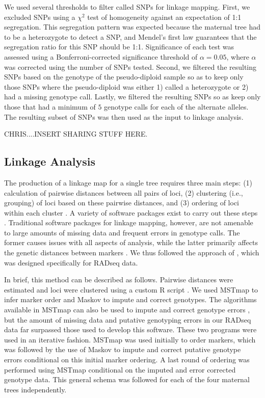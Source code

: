 \documentclass[11pt]{article}
\begin{document}
We used several thresholds to filter called SNPs for linkage mapping. First, 
we excluded SNPs using a $\chi^2$ test of homogeneity against an expectation of 1:1 segregation. This segregation 
pattern was expected because the maternal tree had to be a heterozygote to detect a SNP, and Mendel's first law 
guarantees that the segregation ratio for this SNP should be 1:1. Significance of each test was 
assessed using a Bonferroni-corrected significance threshold of $\alpha = 0.05$, where $\alpha$ was corrected using the 
number of SNPs tested. Second, we filtered the resulting SNPs based on the genotype of the pseudo-diploid sample so as 
to keep only those SNPs where the pseudo-diploid was either 1) called a heterozygote or 2) had a missing genotype call.
Lastly, we filtered the resulting SNPs so as keep only those that had a minimum of $5$ genotype calls for each of the 
alternate alleles. The resulting subset of SNPs was then used as the input to linkage analysis.

CHRIS....INSERT SHARING STUFF HERE.

\subsection*{Linkage Analysis}\label{ss:linkage}
The production of a linkage map for a single tree requires three main steps: (1) calculation of 
pairwise distances between all pairs of loci, (2) clustering (i.e., grouping) of loci based on these pairwise distances, 
and (3) ordering of loci within each cluster \citep{Cheema:2009}.  A variety of software packages exist to carry out these steps 
\citep[e.g.,][]{VanOoijen:2011}. Traditional software packages for linkage mapping, however, are not amenable to large 
amounts of missing data and frequent errors in genotype calls. The former causes issues with all aspects of analysis, while 
the latter primarily affects the genetic distances between markers \citep{Hackett:2003, Cartwright:2007}. We thus followed the approach 
of \citet{Ward:2013}, which was designed specifically for RADseq data. 

In brief, this method can be described as follows. Pairwise distances were estimated and loci were clustered using a 
custom R script \citep{R:2013}. We used MSTmap \citep{Wu:2008a} 
to infer marker order and Maskov \citep{Ward:2013} to impute and correct genotypes. The algorithms available
in MSTmap can also be used to impute and correct genotype errors \citep[see][]{Wu:2008a}, but the amount of missing
data and putative genotyping errors in our RADseq data far surpassed those used to develop this software. These two programs
were used in an iterative fashion. MSTmap was used initially to order markers, which was followed by the use of Maskov
to impute and correct putative genotype errors conditional on this initial marker ordering. A last round of ordering 
was performed using MSTmap conditional on the imputed and error corrected genotype data. This general schema
was followed for each of the four maternal trees independently.
\end{document}
